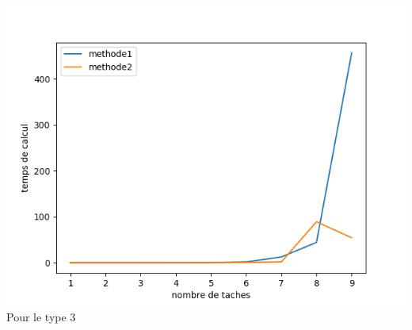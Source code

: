 \documentclass[a4paper, 10pt]{article}
\begin{document}
                \paragraph{}{
                  \includegraphics{graphes/exact_vs_mix_type3.png}
                  Pour le type 3
                }
                  
\end{document}

